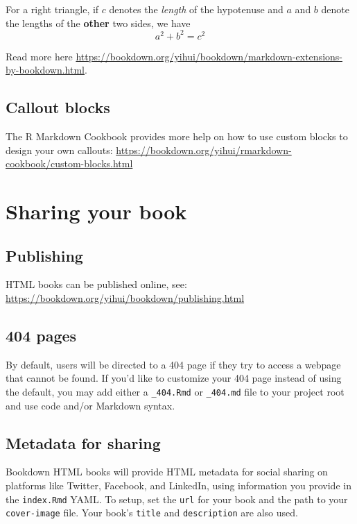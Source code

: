 \documentclass[
]{book}
\begin{document}
\leavevmode{}%
For a right triangle, if \(c\) denotes the \emph{length} of the
hypotenuse and \(a\) and \(b\) denote the lengths of the \textbf{other}
two sides, we have \[a^2 + b^2 = c^2\]

Read more here
\url{https://bookdown.org/yihui/bookdown/markdown-extensions-by-bookdown.html}.

\hypertarget{callout-blocks}{%
\section{Callout blocks}\label{callout-blocks}}

The R Markdown Cookbook provides more help on how to use custom blocks
to design your own callouts:
\url{https://bookdown.org/yihui/rmarkdown-cookbook/custom-blocks.html}

\hypertarget{sharing-your-book}{%
\chapter{Sharing your book}\label{sharing-your-book}}

\hypertarget{publishing}{%
\section{Publishing}\label{publishing}}

HTML books can be published online, see:
\url{https://bookdown.org/yihui/bookdown/publishing.html}

\hypertarget{pages}{%
\section{404 pages}\label{pages}}

By default, users will be directed to a 404 page if they try to access a
webpage that cannot be found. If you'd like to customize your 404 page
instead of using the default, you may add either a \texttt{\_404.Rmd} or
\texttt{\_404.md} file to your project root and use code and/or Markdown
syntax.

\hypertarget{metadata-for-sharing}{%
\section{Metadata for sharing}\label{metadata-for-sharing}}

Bookdown HTML books will provide HTML metadata for social sharing on
platforms like Twitter, Facebook, and LinkedIn, using information you
provide in the \texttt{index.Rmd} YAML. To setup, set the \texttt{url}
for your book and the path to your \texttt{cover-image} file. Your
book's \texttt{title} and \texttt{description} are also used.
\end{document}
